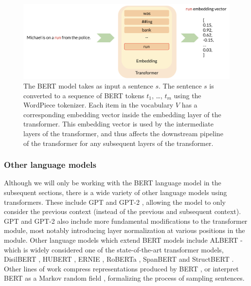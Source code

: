 \documentclass[a4paper,12pt,oneside,openright]{report}
\begin{document}
\begin{figure}[h]
	\center
  \includegraphics[width=\linewidth]{./assets/experiments/pipeline_vanilla_BERT.png}
  \caption{The BERT model takes as input a sentence $s$. The sentence $s$ is converted to a sequence of BERT tokens $t_1$, \ldots, $t_m$ using the WordPiece tokenizer.
Each item in the vocabulary $V$ has a corresponding embedding vector inside the embedding layer of the transformer.
This embedding vector is used by the intermediate layers of the transformer, and thus affects the downstream pipeline of the transformer for any subsequent layers of the transformer.
}
  \label{fig:BERT_vanilla_pipeline}
\end{figure}


\subsubsection{Other language models}

Although we will only be working with the BERT language model in the subsequent sections, there is a wide variety of other language models using transformers.
These include GPT \cite{radford18} and GPT-2 \cite{radford19}, allowing the model to only consider the previous context (instead of the previous and subsequent context).
GPT and GPT-2 also include more fundamental modifications to the transformer module, most notably introducing layer normalization \cite{ba16} at various positions in the module. 
Other language models which extend BERT models include ALBERT \cite{lan20} - which is widely considered one of the state-of-the-art transformer models, DisilBERT \cite{sanh19}, HUBERT \cite{moradshahi19}, ERNIE \cite{sun19}, RoBERTa \cite{liu19}, SpanBERT \cite{joshi19} and StructBERT \cite{wang19d}.
Other lines of work compress representations produced by BERT \cite{shen19}, or interpret BERT as a Markov random field \cite{wang19e}, formalizing the process of sampling sentences.
\end{document}
